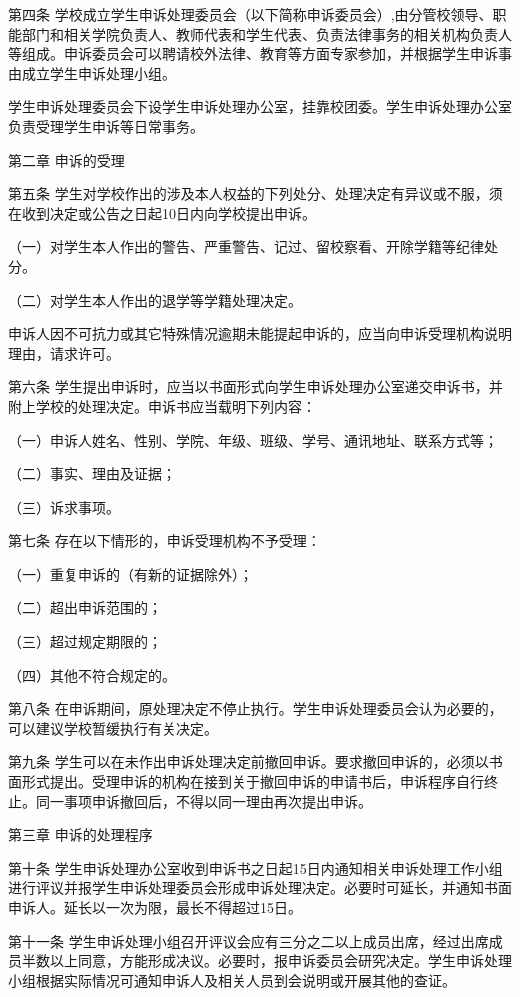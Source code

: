 \documentclass[UTF8,12pt,a4paper]{report}
\begin{document}
第四条  学校成立学生申诉处理委员会（以下简称申诉委员会）,由分管校领导、职能部门和相关学院负责人、教师代表和学生代表、负责法律事务的相关机构负责人等组成。申诉委员会可以聘请校外法律、教育等方面专家参加，并根据学生申诉事由成立学生申诉处理小组。

学生申诉处理委员会下设学生申诉处理办公室，挂靠校团委。学生申诉处理办公室负责受理学生申诉等日常事务。



第二章  申诉的受理

第五条  学生对学校作出的涉及本人权益的下列处分、处理决定有异议或不服，须在收到决定或公告之日起10日内向学校提出申诉。

（一）对学生本人作出的警告、严重警告、记过、留校察看、开除学籍等纪律处分。

（二）对学生本人作出的退学等学籍处理决定。

申诉人因不可抗力或其它特殊情况逾期未能提起申诉的，应当向申诉受理机构说明理由，请求许可。

第六条  学生提出申诉时，应当以书面形式向学生申诉处理办公室递交申诉书，并附上学校的处理决定。申诉书应当载明下列内容：

（一）申诉人姓名、性别、学院、年级、班级、学号、通讯地址、联系方式等；

（二）事实、理由及证据；

（三）诉求事项。

第七条  存在以下情形的，申诉受理机构不予受理：

（一）重复申诉的（有新的证据除外）；

（二）超出申诉范围的；

（三）超过规定期限的；

（四）其他不符合规定的。

第八条  在申诉期间，原处理决定不停止执行。学生申诉处理委员会认为必要的，可以建议学校暂缓执行有关决定。

第九条  学生可以在未作出申诉处理决定前撤回申诉。要求撤回申诉的，必须以书面形式提出。受理申诉的机构在接到关于撤回申诉的申请书后，申诉程序自行终止。同一事项申诉撤回后，不得以同一理由再次提出申诉。



第三章  申诉的处理程序

第十条  学生申诉处理办公室收到申诉书之日起15日内通知相关申诉处理工作小组进行评议并报学生申诉处理委员会形成申诉处理决定。必要时可延长，并通知书面申诉人。延长以一次为限，最长不得超过15日。

第十一条  学生申诉处理小组召开评议会应有三分之二以上成员出席，经过出席成员半数以上同意，方能形成决议。必要时，报申诉委员会研究决定。学生申诉处理小组根据实际情况可通知申诉人及相关人员到会说明或开展其他的查证。
\end{document}
